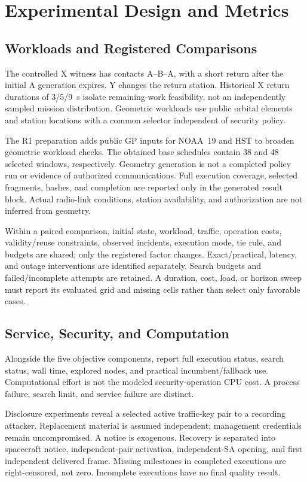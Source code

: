 \documentclass[conference]{IEEEtran}
\begin{document}
\section{Experimental Design and Metrics}
\subsection{Workloads and Registered Comparisons}
The controlled X witness has contacts A--B--A, with a short return after the initial A generation expires. Y changes the return station. Historical X return durations of 3/5/9~s isolate remaining-work feasibility, not an independently sampled mission distribution. Geometric workloads use public orbital elements and station locations with a common selector independent of security policy.

The R1 preparation adds public GP inputs for NOAA~19 and HST to broaden geometric workload checks. The obtained base schedules contain 38 and 48 selected windows, respectively. Geometry generation is not a completed policy run or evidence of authorized communications. Full execution coverage, selected fragments, hashes, and completion are reported only in the generated result block. Actual radio-link conditions, station availability, and authorization are not inferred from geometry.

Within a paired comparison, initial state, workload, traffic, operation costs, validity/reuse constraints, observed incidents, execution mode, tie rule, and budgets are shared; only the registered factor changes. Exact/practical, latency, and outage interventions are identified separately. Search budgets and failed/incomplete attempts are retained. A duration, cost, load, or horizon sweep must report its evaluated grid and missing cells rather than select only favorable cases.

\subsection{Service, Security, and Computation}
Alongside the five objective components, report full execution status, search status, wall time, explored nodes, and practical incumbent/fallback use. Computational effort is not the modeled security-operation CPU cost. A process failure, search limit, and service failure are distinct.

Disclosure experiments reveal a selected active traffic-key pair to a recording attacker. Replacement material is assumed independent; management credentials remain uncompromised. A notice is exogenous. Recovery is separated into spacecraft notice, independent-pair activation, independent-SA opening, and first independent delivered frame. Missing milestones in completed executions are right-censored, not zero. Incomplete executions have no final quality result.
\end{document}
